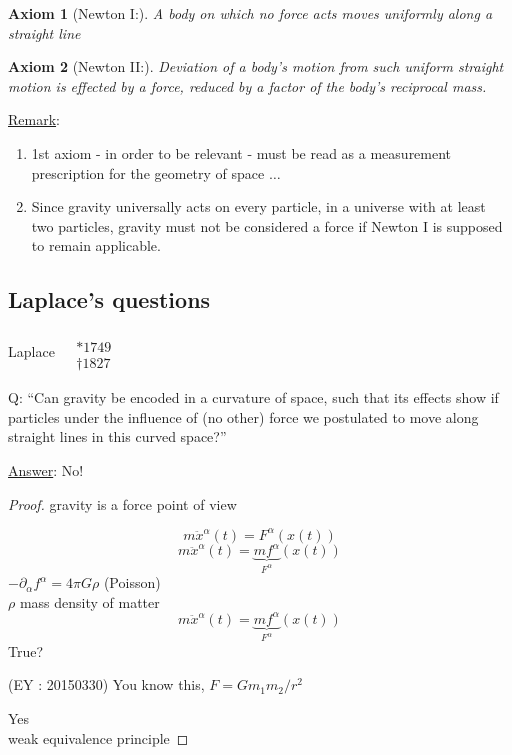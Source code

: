 \documentclass[10pt]{amsart}
\newtheorem{axiom}{Axiom}
\begin{document}
\begin{multicols*}{2}
	\begin{axiom}[Newton I:]
		A body on which \emph{no} force acts moves uniformly along a straight line 
	\end{axiom}
	
	\begin{axiom}[Newton II:]
		Deviation of a body's motion from such uniform straight motion is effected by a force, reduced by a factor of the body's reciprocal mass.  
	\end{axiom}
	
	\underline{Remark}: \begin{enumerate}
		\item[(1)] 1st axiom - in order to be relevant - must be read as a measurement prescription for the geometry of space $\dots $
		\item[(2)] Since gravity universally acts on every particle, in a universe with at least two particles, gravity must not be considered a force if Newton I is supposed to remain applicable.  
	\end{enumerate}
	
	\subsection{Laplace's questions} Laplace $\begin{aligned}  & \quad \\ 
	& * 1749 \\
	& \dag 1827  \end{aligned}$
	
	Q: ``Can gravity be encoded in a curvature of space, such that its effects show if particles under the influence of (no other) force we postulated to move along straight lines in this curved space?''
	
	\underline{Answer}: No!
	
	\begin{proof}
		gravity is a force point of view
		
		
		\[
		m \ddot{x}^{\alpha}(t) = F^{\alpha}(x(t))
		\]
		\[
		m\ddot{x}^{\alpha}(t) = \underbrace{mf^{\alpha}}_{F^{\alpha}}(x(t))
		\]
		$-\partial_{\alpha} f^{\alpha} = 4\pi G\rho$ (Poisson) \\
		$\rho $ mass density of matter
		\[
		m \ddot{x}^{\alpha}(t)= \underbrace{mf^{\alpha}}_{F^{\alpha}}(x(t))
		\]
		True?
		
		(EY : 20150330) You know this, $F=Gm_1m_2/r^2$
		
		Yes \\ 
		weak equivalence principle
		

\end{proof}
\end{multicols*}
\end{document}
